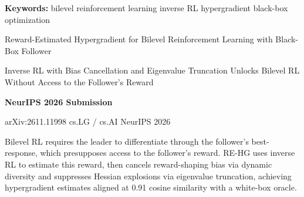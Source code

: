 \documentclass[10pt,twocolumn]{article}
\begin{document}
\setlength{\parindent}{0pt}
\setlength{\parskip}{4pt}

{\small\color{keywordgray}\textbf{Keywords:}
  bilevel reinforcement learning \textbullet{}
  inverse RL \textbullet{}
  hypergradient \textbullet{}
  black-box optimization}\par\vspace{4pt}

{\LARGE\bfseries\raggedright
  Reward-Estimated Hypergradient for Bilevel Reinforcement Learning
  with Black-Box Follower}\par\vspace{4pt}

{\large\itshape\raggedright
  Inverse RL with Bias Cancellation and Eigenvalue Truncation Unlocks
  Bilevel RL Without Access to the Follower's Reward}\par\vspace{6pt}

{\small\textbf{NeurIPS 2026 Submission}}\par\vspace{2pt}

{\small\color{keywordgray}arXiv:2611.11998 \textbullet{}
  cs.LG / cs.AI \textbullet{} NeurIPS 2026}
\par\vspace{2pt}\noindent{\color{rulered}\rule{\columnwidth}{0.6pt}}\vspace{6pt}

Bilevel RL requires the leader to differentiate through the follower's
best-response, which presupposes access to the follower's reward.
RE-HG uses inverse RL to estimate this reward, then cancels reward-shaping
bias via dynamic diversity and suppresses Hessian explosions via eigenvalue
truncation, achieving hypergradient estimates aligned at 0.91 cosine similarity
with a white-box oracle.
\end{document}
